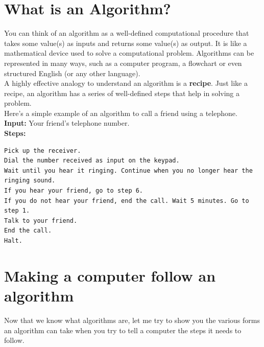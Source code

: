 \documentclass[letterpaper, 12pt]{book}
\begin{document}
\section{What is an Algorithm?}
You can think of an algorithm as a well-defined computational procedure that takes some value(s) as inputs and returns some value(s) as output. It is like a mathematical device used to solve a computational problem. Algorithms can be represented in many ways, such as a computer program, a flowchart or even structured English (or any other language).\\
A highly effective analogy to understand an algorithm is a \textbf{recipe}. Just like a recipe, an algorithm has a series of well-defined steps that help in solving a problem.\\
Here's a simple example of an algorithm to call a friend using a telephone.\\
\textbf{Input: }Your friend's telephone number.\\
\textbf{Steps:}
\begin{lstlisting}
Pick up the receiver.
Dial the number received as input on the keypad.
Wait until you hear it ringing. Continue when you no longer hear the ringing sound.
If you hear your friend, go to step 6.
If you do not hear your friend, end the call. Wait 5 minutes. Go to step 1.
Talk to your friend.
End the call.
Halt.
\end{lstlisting}
\section{Making a computer follow an algorithm}
Now that we know what algorithms are, let me try to show you the various forms an algorithm can take when you try to tell a computer the steps it needs to follow.\\
\end{document}
